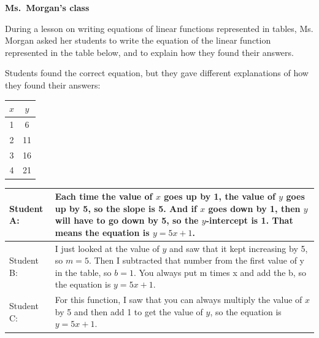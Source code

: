 \documentclass[11pt]{article}
\theoremstyle{definition}
\begin{document}
\begin{mdframed}
\begin{center} {\bf Ms.~Morgan's class} \end{center}
\begin{minipage}{5in}\raggedright \parskip4pt
During a lesson on writing equations of linear functions represented in tables, Ms. Morgan
asked her students to write the equation of the linear function represented in the table below,
and to explain how they found their answers.

Students found the correct equation, but they gave different explanations of how they found
their answers:
\end{minipage}
\begin{minipage}{1in}
\vspace*{-20pt}
\begin{center}\begin{tabular}{c|c}
$x$ & $y$ \\ \hline
1 & 6  \\ 
2 & 11 \\ 
3 & 16 \\
4 & 21 
\end{tabular}
\end{center}
\end{minipage}

\begin{tabular}{L{0.75in}L{5in}}
\hline
Student A: & Each time the value of $x$ goes up by 1, the value of $y$ goes up by 5, so the
slope is 5. And if $x$ goes down by 1, then $y$ will have to go down by 5, so
the $y$-intercept is 1. That means the equation is $y = 5x + 1$.
\\ \hline
Student B: &  I just looked at the value of $y$ and saw that it kept increasing by 5, so $m =
5$. Then I subtracted that number from the first value
of y in the table, so $b = 1$. You always put m times x and add the b, so the
equation is $y = 5x + 1$.
\\ \hline
Student C: & For this function, I saw that you can always multiply the value of $x$ by 5
and then add 1 to get the value of $y$, so the equation is $y = 5x + 1.$
\\ \hline
\end{tabular}
\end{mdframed}
\end{document}
